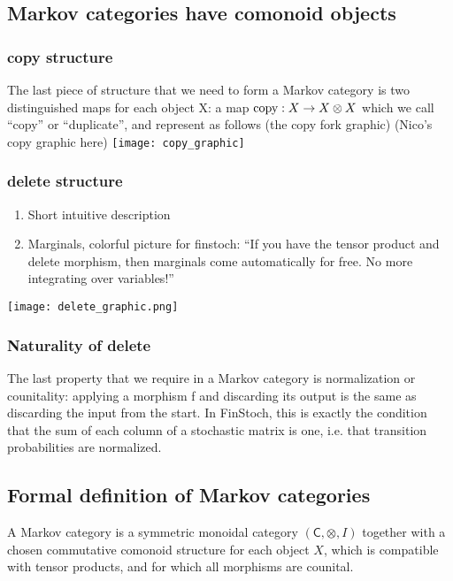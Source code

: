 \subsection{Markov categories have comonoid objects}
\begin{frame}
    \frametitle{copy structure}
The last piece of structure that we need to form a Markov category is two distinguished maps for each object X: a map $\text{\normalfont copy}: X\to X\otimes X$ which we call “copy” or “duplicate”, and represent as follows
(the copy fork graphic)
(Nico's copy graphic here)
\texttt{[image: copy\_graphic]}
\end{frame}


\begin{frame}
    \frametitle{delete structure}
    \begin{enumerate}
        \item Short intuitive description
        \item Marginals, colorful picture for finstoch: “If you have the tensor product and delete morphism, then marginals come automatically for free. No more integrating over variables!”
    \end{enumerate}
    \texttt{[image: delete\_graphic.png]}
\end{frame}

\begin{frame}
    \frametitle{Naturality of delete}
The last property that we require in a Markov category is normalization or counitality: applying a morphism f and discarding its output is the same as discarding the input from the start.  In FinStoch, this is exactly the condition that the sum of each column of a stochastic matrix is one, i.e. that transition probabilities are normalized.
\end{frame}

\subsection{Formal definition of Markov categories}

\begin{frame}
    \begin{definition}
        A Markov category is a symmetric monoidal category $(\mathsf{C}, \otimes, I)$ together with a chosen commutative comonoid structure for each object $X$, which is compatible with tensor products, and for which all morphisms are counital.
    \end{definition}
\end{frame}

